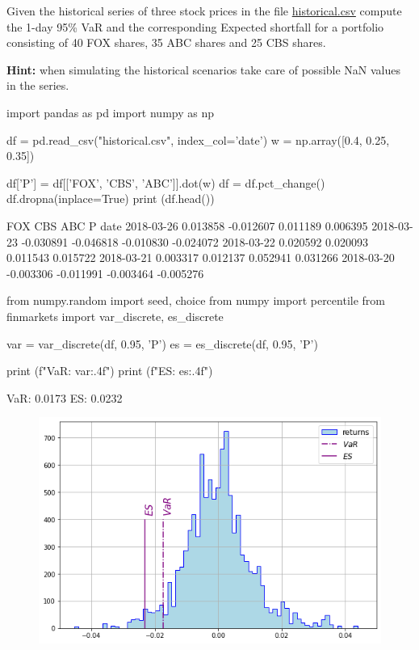 \begin{question}
Given the historical series of three stock prices in the file \href{https://raw.githubusercontent.com/matteosan1/finance_course/master/input_files/historical.csv}{historical.csv} compute the 1-day 95\% VaR and the corresponding Expected shortfall for a portfolio consisting of 40 FOX shares, 35 ABC shares and 25 CBS shares. 

\noindent\textbf{Hint:} when simulating the historical scenarios take care of possible NaN values in the series.
\end{question}

\cprotEnv\begin{solution}
\begin{ipython}
import pandas as pd
import numpy as np

df = pd.read_csv("historical.csv", index_col='date')
w = np.array([0.4, 0.25, 0.35])

df['P'] = df[['FOX', 'CBS', 'ABC']].dot(w)
df = df.pct_change()
df.dropna(inplace=True)
print (df.head())
\end{ipython}
\begin{ioutput}
                 FOX       CBS       ABC         P
date                                              
2018-03-26  0.013858 -0.012607  0.011189  0.006395
2018-03-23 -0.030891 -0.046818 -0.010830 -0.024072
2018-03-22  0.020592  0.020093  0.011543  0.015722
2018-03-21  0.003317  0.012137  0.052941  0.031266
2018-03-20 -0.003306 -0.011991 -0.003464 -0.005276
\end{ioutput}
\begin{ipython}
from numpy.random import seed, choice
from numpy import percentile
from finmarkets import var_discrete, es_discrete
 
var = var_discrete(df, 0.95, 'P')
es = es_discrete(df, 0.95, 'P')

print (f"VaR: {var:.4f}")
print (f"ES: {es:.4f}")
\end{ipython}
\begin{ioutput}
VaR: 0.0173
ES: 0.0232
\end{ioutput}
\begin{figure}[htbp]
\centering
\includegraphics[width=0.7\linewidth]{figures/hist_var_ex}
\end{figure}
\end{solution}

